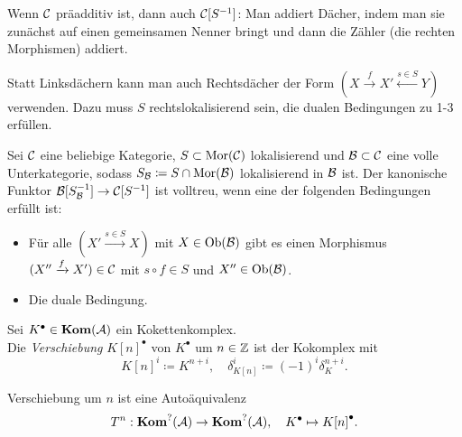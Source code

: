\documentclass{cheat-sheet}
\newcommand{\CCC}[1]{{#1}^{\bullet}} %
\begin{document}
\begin{bem}
  Wenn $\mathcal{C}$ präadditiv ist, dann auch $\mathcal{C}[S^{-1}]$: Man addiert Dächer, indem man sie zunächst auf einen gemeinsamen Nenner bringt und dann die Zähler (die rechten Morphismen) addiert.
\end{bem}

\begin{bem}
  Statt Linksdächern kann man auch Rechtsdächer der Form $(X \xrightarrow{f} X' \xleftarrow{s \in S} Y)$ verwenden. Dazu muss $S$ rechtslokalisierend sein, \dh{} die dualen Bedingungen zu 1-3 erfüllen.
\end{bem}

\begin{prop}
  Sei $\mathcal{C}$ eine beliebige Kategorie, $S \subset \operatorname{Mor}(\mathcal{C})$ lokalisierend und $\mathcal{B} \subset \mathcal{C}$ eine volle Unterkategorie, sodass $S_{\mathcal{B}} \coloneqq S \cap \operatorname{Mor}(\mathcal{B})$ lokalisierend in $\mathcal{B}$ ist.
  Der kanonische Funktor $\mathcal{B}[S_{\mathcal{B}}^{-1}] \to \mathcal{C}[S^{-1}]$ ist volltreu, wenn eine der folgenden Bedingungen erfüllt ist:
  \begin{itemize}
    \item Für alle $(X' \xrightarrow{s \in S} X)$ mit $X \in \operatorname{Ob}(\mathcal{B})$ gibt es einen Morphismus $(X'' \xrightarrow{f} X') \in \mathcal{C}$ mit $s \circ f \in S$ und $X'' \in \operatorname{Ob}(\mathcal{B})$.
    \item Die duale Bedingung.
  \end{itemize}
\end{prop}




\begin{defn}
  Sei $\CCC{K} \in \Kom(\Aat)$ ein Kokettenkomplex. \\
  Die \emph{Verschiebung} $\CCC{K[n]}$ von $\CCC{K}$ um $n \in \mathbb{Z}$ ist der Kokomplex mit
  \[
    K[n]^i \coloneqq K^{n+i}, \quad
    \delta_{K[n]}^i \coloneqq (-1)^i \delta_K^{n+i}.
  \]
\end{defn}

\begin{bem}
  Verschiebung um $n$ ist eine Autoäquivalenz
  \[
    T^n : \Kom^?(\Aat) \to \Kom^?(\Aat), \quad
    \CCC{K} \mapsto \CCC{K[n]}.
  \]
\end{bem}
\end{document}
